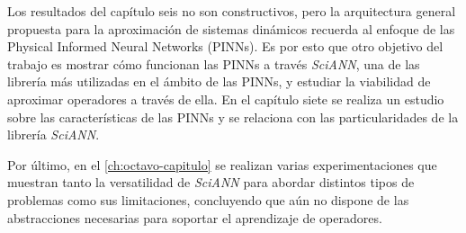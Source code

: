 Los resultados del capítulo seis no son constructivos, pero la arquitectura general propuesta para la aproximación de sistemas dinámicos recuerda al enfoque de las Physical Informed Neural Networks (PINNs). Es por esto que otro objetivo del trabajo es mostrar cómo funcionan las PINNs a través \textit{SciANN}, una de las librería más utilizadas en el ámbito de las PINNs, y estudiar la viabilidad de aproximar operadores a través de ella. En el capítulo siete se realiza un estudio sobre las características de las PINNs y se relaciona con las particularidades de la librería \textit{SciANN}. 

Por último, en el \autoref{ch:octavo-capitulo} se realizan varias experimentaciones que muestran tanto la versatilidad de \textit{SciANN} para abordar distintos tipos de problemas como sus limitaciones, concluyendo que aún no dispone de las abstracciones necesarias para soportar el aprendizaje de operadores.







\endinput
